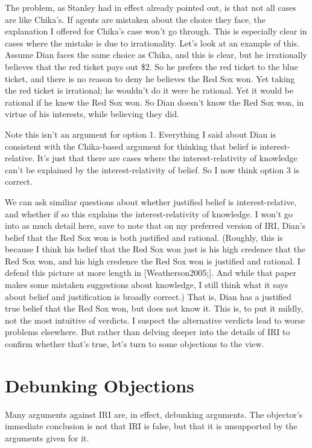 \documentclass[
  11pt,
  letterpaper,
  DIV=11,
  numbers=noendperiod,
  twoside]{scrartcl}
\begin{document}
The problem, as Stanley had in effect already pointed out, is that not
all cases are like Chika's. If agents are mistaken about the choice they
face, the explanation I offered for Chika's case won't go through. This
is especially clear in cases where the mistake is due to irrationality.
Let's look at an example of this. Assume Dian faces the same choice as
Chika, and this is clear, but he irrationally believes that the red
ticket pays out \$2. So he prefers the red ticket to the blue ticket,
and there is no reason to deny he believes the Red Sox won. Yet taking
the red ticket is irrational; he wouldn't do it were he rational. Yet it
would be rational if he knew the Red Sox won. So Dian doesn't know the
Red Sox won, in virtue of his interests, while believing they did.

Note this isn't an argument for option 1. Everything I said about Dian
is consistent with the Chika-based argument for thinking that belief is
interest-relative. It's just that there are cases where the
interest-relativity of knowledge can't be explained by the
interest-relativity of belief. So I now think option 3 is correct.

We can ask similiar questions about whether justified belief is
interest-relative, and whether if so this explains the
interest-relativity of knowledge. I won't go into as much detail here,
save to note that on my preferred version of IRI, Dian's belief that the
Red Sox won is both justified and rational. (Roughly, this is because I
think his belief that the Red Sox won just is his high credence that the
Red Sox won, and his high credence the Red Sox won is justified and
rational. I defend this picture at more length in {[}Weatherson2005;{]}.
And while that paper makes some mistaken suggestions about knowledge, I
still think what it says about belief and justification is broadly
correct.) That is, Dian has a justified true belief that the Red Sox
won, but does not know it. This is, to put it mildly, not the most
intuitive of verdicts. I suspect the alternative verdicts lead to worse
problems elsewhere. But rather than delving deeper into the details of
IRI to confirm whether that's true, let's turn to some objections to the
view.

\section{Debunking Objections}\label{debunkingobjections}

Many arguments against IRI are, in effect, debunking arguments. The
objector's immediate conclusion is not that IRI is false, but that it is
unsupported by the arguments given for it.
\end{document}
